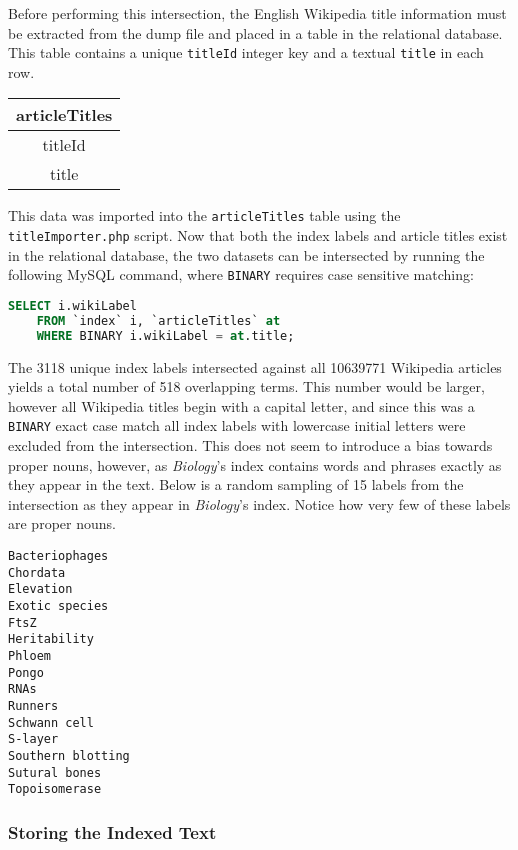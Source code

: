 Before performing this intersection, the English Wikipedia title information must be extracted from the dump file and placed in a table in the relational database.
This table contains a unique {\tt titleId} integer key and a textual {\tt title} in each row.

\begin{center}
\begin{tabular}{|c|}
\hline 
{\bf articleTitles} \\ 
\hline 
titleId \\ 
\hline 
title \\ 
\hline 
\end{tabular} 
\end{center}

This data was imported into the {\tt articleTitles} table using the {\tt titleImporter.php} script.
Now that both the index labels and article titles exist in the relational database, the two datasets can be intersected by running the following MySQL command, where {\tt BINARY} requires case sensitive matching:

\begin{lstlisting}[language=SQL]
SELECT i.wikiLabel
    FROM `index` i, `articleTitles` at
    WHERE BINARY i.wikiLabel = at.title;
\end{lstlisting}

The 3118 unique index labels intersected against all 10639771 Wikipedia articles yields a total number of 518 overlapping terms.
This number would be larger, however all Wikipedia titles begin with a capital letter, and since this was a {\tt BINARY} exact case match all index labels with lowercase initial letters were excluded from the intersection.
This does not seem to introduce a bias towards proper nouns, however, as {\it Biology}'s index contains words and phrases exactly as they appear in the text.
Below is a random sampling of 15 labels from the intersection as they appear in {\it Biology}'s index.
Notice how very few of these labels are proper nouns.

\begin{multicols}{3}
\begin{verbatim}
Bacteriophages
Chordata
Elevation
Exotic species
FtsZ
Heritability
Phloem
Pongo
RNAs
Runners
Schwann cell
S-layer
Southern blotting
Sutural bones
Topoisomerase
\end{verbatim}
\end{multicols}

\subsubsection{Storing the Indexed Text}

